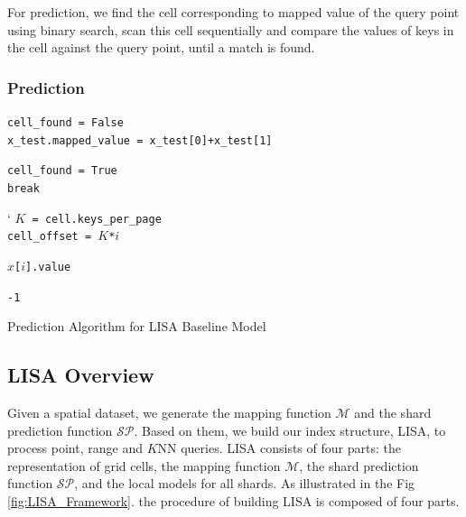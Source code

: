 For prediction, we find the cell corresponding to mapped value of the query point using binary search, scan this cell sequentially and compare the values of keys in the cell against the query point, until a match is found.

\subsubsection{Prediction}

\begin{algorithm}[H]
    \SetAlgoLined
    \texttt{cell\_found = False }\\
    \texttt{x\_test.mapped\_value = x\_test[0]+x\_test[1] } \\
    {
        \If{ x\_test.mapped\_value$\in$ [cell[$i$].lower, cell[$i$].upper)} 
        {
		    \texttt{cell\_found = True }\\
		    \texttt{break }
		   
		}
    }
     {
    `   \texttt{$K$ =  cell.keys\_per\_page  }\\
        \texttt{cell\_offset = $K$*$i$  }\\
    {   
        {
		   	\Return \texttt{$x$[$i$].value}
		   
		}
    }
    }
  
 	 	\Return \texttt{-1}
     \caption{Prediction Algorithm for LISA Baseline Model }
\end{algorithm}


\subsection{LISA Overview}

Given a spatial dataset, we generate the mapping function $\mathcal{M}$ and the shard prediction function $\mathcal{SP}$. Based on them, we build our index structure, LISA, to process point, range and $K$NN queries. LISA consists of four parts: the representation of grid cells, the mapping function $\mathcal{M}$, the shard prediction function $\mathcal{SP}$, and the local models for all shards. As illustrated in the Fig \ref{fig:LISA_Framework}. the procedure of building LISA is composed of four parts.

